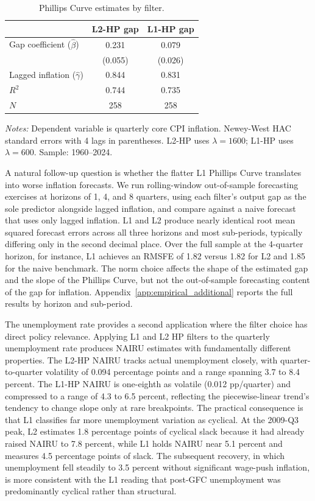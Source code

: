 \documentclass[10pt]{article}
\begin{document}
\begin{table}[htbp]
\centering
\caption{Phillips Curve estimates by filter.}
\label{tab:phillips_curve}
\begin{tabular}{l cc}
\toprule
 & L2-HP gap & L1-HP gap \\
\midrule
Gap coefficient ($\hat{\beta}$) & 0.231 & 0.079 \\
 & (0.055) & (0.026) \\[4pt]
Lagged inflation ($\hat{\gamma}$) & 0.844 & 0.831 \\[4pt]
$R^2$ & 0.744 & 0.735 \\
$N$ & 258 & 258 \\
\bottomrule
\end{tabular}
\begin{tablenotes}
\small
\item \textit{Notes:} Dependent variable is quarterly core CPI inflation. Newey-West HAC standard errors with 4 lags in parentheses. L2-HP uses $\lambda=1600$; L1-HP uses $\lambda=600$. Sample: 1960--2024.
\end{tablenotes}
\end{table}

A natural follow-up question is whether the flatter L1 Phillips Curve translates into worse inflation forecasts. We run rolling-window out-of-sample forecasting exercises at horizons of 1, 4, and 8 quarters, using each filter's output gap as the sole predictor alongside lagged inflation, and compare against a naive forecast that uses only lagged inflation. L1 and L2 produce nearly identical root mean squared forecast errors across all three horizons and most sub-periods, typically differing only in the second decimal place. Over the full sample at the 4-quarter horizon, for instance, L1 achieves an RMSFE of 1.82 versus 1.82 for L2 and 1.85 for the naive benchmark. The norm choice affects the shape of the estimated gap and the slope of the Phillips Curve, but not the out-of-sample forecasting content of the gap for inflation. Appendix~\ref{app:empirical_additional} reports the full results by horizon and sub-period.

The unemployment rate provides a second application where the filter choice has direct policy relevance. Applying L1 and L2 HP filters to the quarterly unemployment rate produces NAIRU estimates with fundamentally different properties. The L2-HP NAIRU tracks actual unemployment closely, with quarter-to-quarter volatility of 0.094 percentage points and a range spanning 3.7 to 8.4 percent. The L1-HP NAIRU is one-eighth as volatile (0.012 pp/quarter) and compressed to a range of 4.3 to 6.5 percent, reflecting the piecewise-linear trend's tendency to change slope only at rare breakpoints. The practical consequence is that L1 classifies far more unemployment variation as cyclical. At the 2009-Q3 peak, L2 estimates 1.8 percentage points of cyclical slack because it had already raised NAIRU to 7.8 percent, while L1 holds NAIRU near 5.1 percent and measures 4.5 percentage points of slack. The subsequent recovery, in which unemployment fell steadily to 3.5 percent without significant wage-push inflation, is more consistent with the L1 reading that post-GFC unemployment was predominantly cyclical rather than structural.
\end{document}
